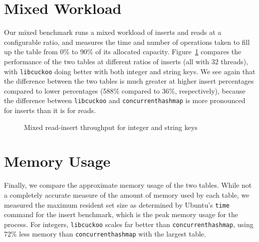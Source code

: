 \documentclass{article}
\newcommand{\tbbmap}{\texttt{concurrent\textunderscore hash\textunderscore map}}
\newcommand{\libcuckoo}{\texttt{libcuckoo}}
\begin{document}
\section*{Mixed Workload}
Our mixed benchmark runs a mixed workload of inserts and reads at a configurable
ratio, and measures the time and number of operations taken to fill up the table
from 0\% to 90\% of its allocated capacity. Figure~\ref{fig:mixed-read-insert}
compares the performance of the two tables at different ratios of inserts (all
with 32 threads), with {\libcuckoo} doing better with both integer and string
keys. We see again that the difference between the two tables is much greater at
higher insert percentages compared to lower percentages (588\% compared to 36\%,
respectively), because the difference between {\libcuckoo} and {\tbbmap} is more
pronounced for inserts than it is for reads.

\begin{figure}[!htbp]
  \centering
  \caption{Mixed read-insert throughput for integer and string keys}
  \label{fig:mixed-read-insert}
\end{figure}

\section*{Memory Usage}
Finally, we compare the approximate memory usage of the two tables. While not a
completely accurate measure of the amount of memory used by each table, we
measured the maximum resident set size as determined by Ubuntu's \texttt{time}
command for the insert benchmark, which is the peak memory usage for the
process. For integers, {\libcuckoo} scales far better than {\tbbmap}, using 72\%
less memory than {\tbbmap} with the largest table.
\end{document}

